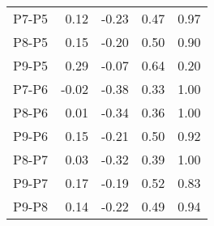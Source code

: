 \begin{table}[ht]
\begin{tabular}{rrrrr}
  P7-P5 & 0.12 & -0.23 & 0.47 & 0.97 \\ 
  P8-P5 & 0.15 & -0.20 & 0.50 & 0.90 \\ 
  P9-P5 & 0.29 & -0.07 & 0.64 & 0.20 \\ 
  P7-P6 & -0.02 & -0.38 & 0.33 & 1.00 \\ 
  P8-P6 & 0.01 & -0.34 & 0.36 & 1.00 \\ 
  P9-P6 & 0.15 & -0.21 & 0.50 & 0.92 \\ 
  P8-P7 & 0.03 & -0.32 & 0.39 & 1.00 \\ 
  P9-P7 & 0.17 & -0.19 & 0.52 & 0.83 \\ 
  P9-P8 & 0.14 & -0.22 & 0.49 & 0.94 \\ 
   \hline
\end{tabular}
\end{table}